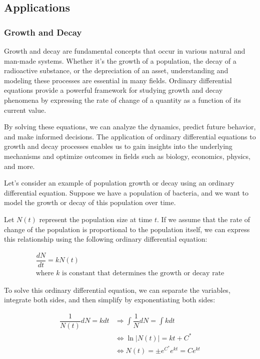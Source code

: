 \documentclass[13pt,a4paper]{report}
\begin{document}
\newpage
\subsection{Applications}

\subsubsection{Growth and Decay}
Growth and decay are fundamental concepts that occur in various natural and man-made systems. Whether it's the growth of a population, the decay of a radioactive substance, or the depreciation of an asset, understanding and modeling these processes are essential in many fields. Ordinary differential equations provide a powerful framework for studying growth and decay phenomena by expressing the rate of change of a quantity as a function of its current value.

By solving these equations, we can analyze the dynamics, predict future behavior, and make informed decisions. The application of ordinary differential equations to growth and decay processes enables us to gain insights into the underlying mechanisms and optimize outcomes in fields such as biology, economics, physics, and more.

Let's consider an example of population growth or decay using an ordinary differential equation. Suppose we have a population of bacteria, and we want to model the growth or decay of this population over time.

Let $N(t)$ represent the population size at time $t$. If we assume that the rate of change of the population is proportional to the population itself, we can express this relationship using the following ordinary differential equation:

\begin{gather*}
\dfrac{dN}{dt} = kN(t)\\
\text{where } k \text{ is constant that determines the growth or decay rate}
\end{gather*}

To solve this ordinary differential equation, we can separate the variables, integrate both sides, and then simplify by exponentiating both sides:

$$
\begin{aligned}
\dfrac{1}{N(t)} dN = kdt&\Rightarrow \int\dfrac{1}{N} dN = \int k dt\\
&\Leftrightarrow \ln|N(t)| = kt + C^*\\
&\Leftrightarrow N(t) = \pm e^{C^*}e^{kt} = Ce^{kt}\\
\end{aligned}
$$
\end{document}
